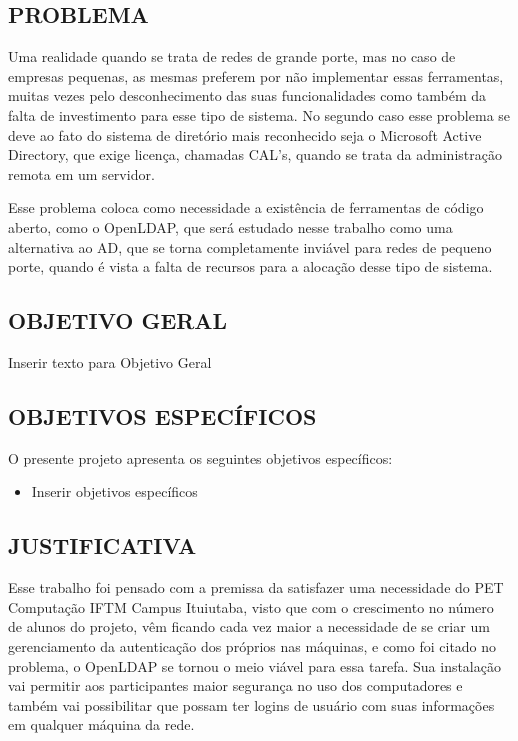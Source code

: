 \subsection{PROBLEMA}
\label{subsec:problema}
Uma realidade quando se trata de redes de grande porte, mas no caso de empresas pequenas, as mesmas preferem por não implementar essas ferramentas, muitas vezes pelo desconhecimento das suas funcionalidades como também da falta de investimento para esse tipo de sistema. No segundo caso esse problema se deve ao fato do sistema de diretório mais reconhecido seja o Microsoft Active Directory, que exige licença, chamadas CAL's, quando se trata da administração remota em um servidor.

Esse problema coloca como necessidade a existência de ferramentas de código aberto, como o OpenLDAP, que será estudado nesse trabalho como uma alternativa ao AD, que se torna completamente inviável para redes de pequeno porte, quando é vista a falta de recursos para a alocação desse tipo de sistema.


\subsection{OBJETIVO GERAL}
\label{subsec:objetivo-geral}
Inserir texto para Objetivo Geral

\subsection{OBJETIVOS ESPECÍFICOS}
\label{subsec:objetivos-específicos}
O presente projeto apresenta os seguintes objetivos específicos:
\begin{itemize}
	\item Inserir objetivos específicos
\end{itemize}

\subsection{JUSTIFICATIVA}
\label{subsec:justificativa}
Esse trabalho foi pensado com a premissa da satisfazer uma necessidade do PET Computação IFTM Campus Ituiutaba, visto que com o crescimento no número de alunos do projeto, vêm ficando cada vez maior a necessidade de se criar um gerenciamento da autenticação dos próprios nas máquinas, e como foi citado no problema, o OpenLDAP se tornou o meio viável para essa tarefa. Sua instalação vai permitir aos participantes maior segurança no uso dos computadores e também vai possibilitar que possam ter logins de usuário com suas informações em qualquer máquina da rede.

